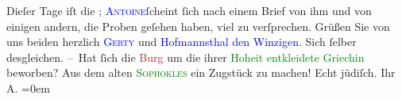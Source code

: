            \pstart
           Dieſer Tage iſt die \label{K_L01335_2v}\label{K_L01335_2h}; \textcolor{blue}{\textsc{Antoine}}{}\ledrightnote{\textcolor{blue}{André Antoine}}{ }ſcheint ſich nach einem Brief von ihm und von
               einigen andern, die Proben geſehen haben, viel {\pb}zu
               verſprechen.\pend
           \pstart
           Grüßen Sie von uns beiden herzlich \textcolor{blue}{\textsc{Gerty}}{}\ledrightnote{\textcolor{blue}{Gertrude von Hofmannsthal}} und \textcolor{blue}{Hofmannsthal den
                  Winzigen}{}. Sich ſelber desgleichen.\pend
           \pstart
           – Hat ſich die \textcolor{brown}{Burg}{}\ledrightnote{\textcolor{brown}{Burgtheater}} um die ihrer \textcolor{green}{Hoheit entkleidete Griechin}{} beworben?{\dotstwo} Aus dem alten \textcolor{blue}{\textcolor{green}{\textsc{Sophokles}}{}}{}\ledrightnote{\textcolor{blue}{Sophokles}} ein Zugstück zu machen! Echt {\pb}jüdiſch.\pend
           \pstart
           Ihr{\\[\baselineskip]}\spacefill\mbox{A.}\pend
           \leftskip=0em{}\endnumbering{}  
      